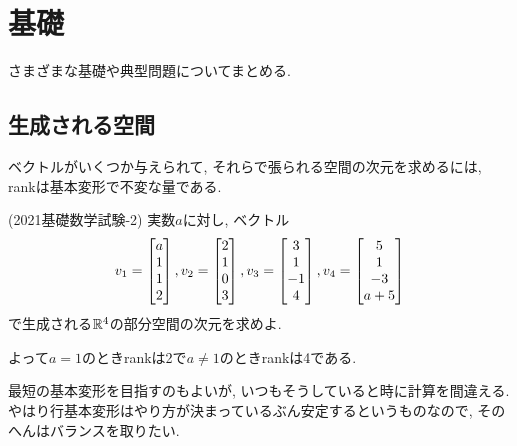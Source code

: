 \section{基礎}
さまざまな基礎や典型問題についてまとめる.

\subsection{生成される空間}

ベクトルがいくつか与えられて, それらで張られる空間の次元を求めるには,  rankは基本変形で不変な量である.

\begin{egprob} (2021基礎数学試験-2)
実数$a$に対し, ベクトル
\[v_1 = \begin{bmatrix}a\\1\\1\\2\end{bmatrix}, v_2 = \begin{bmatrix}2\\1\\0\\3\end{bmatrix}, v_3 = \begin{bmatrix}3\\1\\-1\\4\end{bmatrix}, v_4 = \begin{bmatrix}5\\1\\-3\\a+5\end{bmatrix}\]
で生成される$\mathbb{R}^4$の部分空間の次元を求めよ.
\end{egprob}
\begin{egans}
よって$a=1$のときrankは2で$a\neq 1$のときrankは4である.
\end{egans}
\begin{rem}
最短の基本変形を目指すのもよいが, いつもそうしていると時に計算を間違える. やはり行基本変形はやり方が決まっているぶん安定するというものなので, そのへんはバランスを取りたい.
\end{rem}





